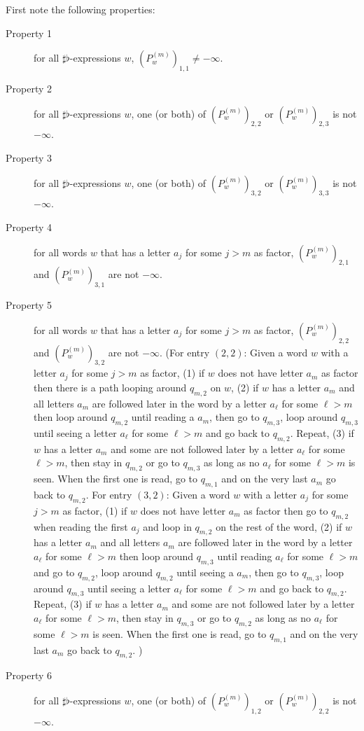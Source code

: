 \documentclass{lmcs}
\theoremstyle{remark}
\theoremstyle{remark}
\begin{document}
First note the following properties:
\begin{description}
    
    \item[Property 1] for all $\sharp \flat$-expressions $w$, $(P^{(m)}_w)_{1,1} \neq -\infty$.
    \item[Property 2] for all $\sharp \flat$-expressions $w$, one (or both) of  $(P^{(m)}_w)_{2,2}$ or $(P^{(m)}_w)_{2,3}$ is not $-\infty$.
    \item[Property 3] for all $\sharp \flat$-expressions $w$, one (or both) of  $(P^{(m)}_w)_{3,2}$ or $(P^{(m)}_w)_{3,3}$ is not $-\infty$.
    \item[Property 4] for all words $w$ that has a letter $a_j$ for some $j>m$ as factor, $(P^{(m)}_w)_{2,1}$ and $(P^{(m)}_w)_{3,1}$ are not $-\infty$.
    \item[Property 5] for all words $w$ that has a letter $a_j$ for some $j>m$ as factor, $(P^{(m)}_w)_{2,2}$ and $(P^{(m)}_w)_{3,2}$ are not $-\infty$. (For entry $(2,2)$: Given a word $w$ with a letter $a_j$ for some $j>m$ as factor, (1) if $w$ does not have letter $a_m$ as factor then there is a path looping around $q_{m,2}$ on $w$, (2) if $w$ has a letter $a_m$ and all letters $a_m$ are followed later in the word by a letter $a_\ell$ for some $\ell > m$ then loop around $q_{m,2}$ until reading a $a_m$, then go to $q_{m,3}$, loop around $q_{m,3}$ until seeing a letter $a_\ell$ for some $\ell > m$ and go back to $q_{m,2}$. Repeat, (3) if $w$ has a letter $a_m$ and some are not followed later by a letter $a_\ell$ for some $\ell > m$, then stay in $q_{m,2}$ or go to $q_{m,3}$ as long as no $a_\ell$ for some $\ell > m$ is seen. When the first one is read, go to $q_{m,1}$ and on the very last $a_m$ go back to $q_{m,2}$.
    For entry $(3,2)$: Given a word $w$ with a letter $a_j$ for some $j>m$ as factor, (1) if $w$ does not have letter $a_m$ as factor then go to $q_{m,2}$ when reading the first $a_j$ and loop in $q_{m,2}$ on the rest of the word, (2) if $w$ has a letter $a_m$ and all letters $a_m$ are followed later in the word by a letter $a_\ell$ for some $\ell > m$ then loop around $q_{m,3}$ until reading $a_\ell$ for some $\ell > m$ and go to $q_{m,2}$, loop around $q_{m,2}$ until seeing a $a_m$, then go to $q_{m,3}$, loop around $q_{m,3}$ until seeing a letter $a_\ell$ for some $\ell > m$ and go back to $q_{m,2}$. Repeat, (3) if $w$ has a letter $a_m$ and some are not followed later by a letter $a_\ell$ for some $\ell > m$, then stay in $q_{m,3}$ or go to $q_{m,2}$ as long as no $a_\ell$ for some $\ell > m$ is seen. When the first one is read, go to $q_{m,1}$ and on the very last $a_m$ go back to $q_{m,2}$.
    ) 
    \item[Property 6] for all $\sharp \flat$-expressions $w$, one (or both) of  $(P^{(m)}_w)_{1,2}$ or $(P^{(m)}_w)_{2,2}$ is not $-\infty$.

\end{description}
\end{document}
